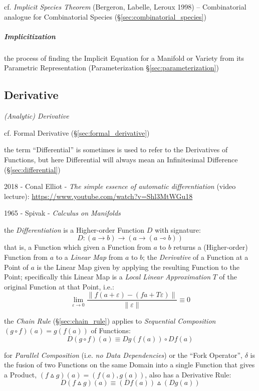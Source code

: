 cf. \emph{Implicit Species Theorem} (Bergeron, Labelle, Leroux 1998) --
Combinatorial analogue for Combinatorial Species
(\S\ref{sec:combinatorial_species})



\subparagraph{Implicitization}\label{sec:implicitization}\hfill

the process of finding the Implicit Equation for a Manifold or Variety from its
Parametric Representation (Parameterization \S\ref{sec:parameterization})



\subsection{Derivative}\label{sec:derivative}

\emph{(Analytic) Derivative}

\fist cf. Formal Derivative (\S\ref{sec:formal_derivative})

the term ``Differential'' is sometimes is used to
refer to the Derivatives of Functions, but here Differential will always mean an
Infinitesimal Difference (\S\ref{sec:differential})

2018 - Conal Elliot - \emph{The simple essence of automatic differentiation}
(video lecture): \url{https://www.youtube.com/watch?v=Shl3MtWGu18}

1965 - Spivak - \emph{Calculus on Manifolds}

the \emph{Differentiation} is a Higher-order Function $D$ with signature:
\[
  D : (a \rightarrow b) \rightarrow (a \rightarrow (a \multimap b))
\]
that is, a Function which given a Function from $a$ to $b$ returns a
(Higher-order) Function from $a$ to a \emph{Linear Map} from $a$ to $b$; the
\emph{Derivative} of a Function at a Point of $a$ is the Linear Map given by
applying the resulting Function to the Point; specifically this Linear Map is a
\emph{Local Linear Approximation} $T$ of the original Function at that Point,
i.e.:
\[
  \lim_{\varepsilon \rightarrow 0}
    \frac{\|f (a + \varepsilon) - (f a + T \varepsilon)\|}{\|\varepsilon\|}
    \equiv 0
\]

the \emph{Chain Rule} (\S\ref{sec:chain_rule}) applies to \emph{Sequential
  Composition} $(g \circ f)(a) = g (f (a))$ of Functions:
\[
  D(g \circ f) (a) \equiv D g (f(a)) \circ D f (a)
\]

for \emph{Parallel Composition} (i.e. \emph{no Data Dependencies}) or the ``Fork
Operator'', $\delta$ is the fusion of two Functions on the same Domain into a
single Function that gives a Product, $(f \vartriangle g)(a) = (f(a), g(a))$,
also has a Derivative Rule:
\[
  D(f \vartriangle g)(a) \equiv (D f (a)) \vartriangle (D g (a))
\]

